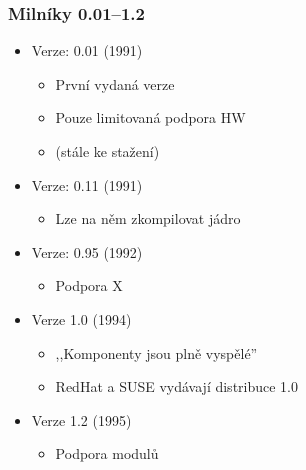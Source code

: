 \documentclass[xcolor=dvipsnames,handout]{beamer}
\begin{document}
\begin{frame}
  \frametitle{Milníky 0.01--1.2}

  \begin{itemize}
    \item Verze: 0.01 (1991)
    \begin{itemize}
      \item První vydaná verze
      \item Pouze limitovaná podpora HW
      \item (stále ke stažení)
    \end{itemize}

    \pause

    \item Verze: 0.11 (1991)
    \begin{itemize}
      \item Lze na něm zkompilovat jádro
    \end{itemize}

    \pause

    \item Verze: 0.95 (1992)
    \begin{itemize}
      \item Podpora X
    \end{itemize}

    \pause

    \item Verze 1.0 (1994)
    \begin{itemize}
      \item ,,Komponenty jsou plně vyspělé''
      \item RedHat a SUSE vydávají distribuce 1.0
    \end{itemize}

    \pause

    \item Verze 1.2 (1995)
    \begin{itemize}
      \item Podpora modulů
    \end{itemize}

  \end{itemize}

\end{frame}
\end{document}
